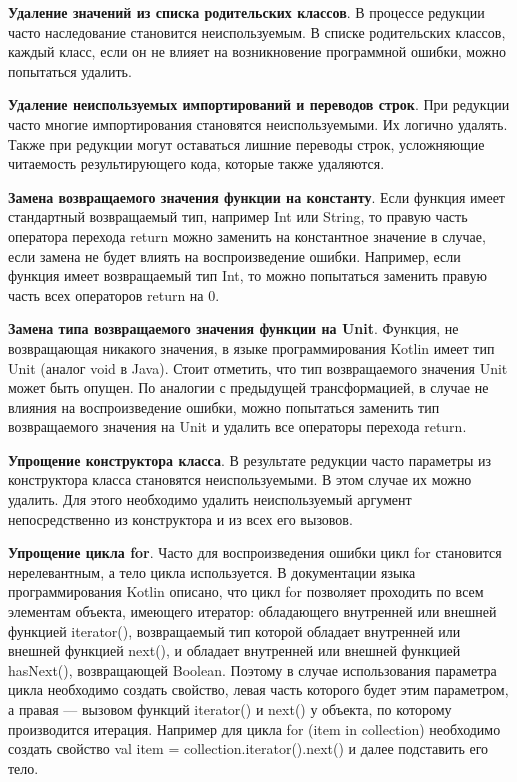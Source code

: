 \textbf{Удаление значений из списка родительских классов}. В процессе редукции часто наследование становится неиспользуемым. В списке родительских классов, каждый класс, если он не влияет на возникновение программной ошибки, можно попытаться удалить.

\textbf{Удаление неиспользуемых импортирований и переводов строк}. При редукции часто многие импортирования становятся неиспользуемыми. Их логично удалять. Также при редукции могут оставаться лишние переводы строк, усложняющие читаемость результирующего кода, которые также удаляются.

\textbf{Замена возвращаемого значения функции на константу}. Если функция имеет стандартный возвращаемый тип, например Int или String, то правую часть оператора перехода return можно заменить на константное значение в случае, если замена не будет влиять на воспроизведение ошибки. Например, если функция имеет возвращаемый тип Int, то можно попытаться заменить правую часть всех операторов return на 0.

\textbf{Замена типа возвращаемого значения функции на Unit}. Функция, не возвращающая никакого значения, в языке программирования Kotlin имеет тип Unit (аналог void в Java). Стоит отметить, что тип возвращаемого значения Unit может быть опущен. По аналогии с предыдущей трансформацией, в случае не влияния на воспроизведение ошибки, можно попытаться заменить тип возвращаемого значения на Unit и удалить все операторы перехода return.

\textbf{Упрощение конструктора класса}. В результате редукции часто параметры из конструктора класса становятся неиспользуемыми. В этом случае их можно удалить. Для этого необходимо удалить неиспользуемый аргумент непосредственно из конструктора и из всех его вызовов.

\textbf{Упрощение цикла for}. Часто для воспроизведения ошибки цикл for становится нерелевантным, а тело цикла используется. В документации языка программирования Kotlin описано, что цикл for позволяет проходить по всем элементам объекта, имеющего итератор:
обладающего внутренней или внешней функцией iterator(), возвращаемый тип которой обладает внутренней или внешней функцией next(), и обладает внутренней или внешней функцией hasNext(), возвращающей Boolean. Поэтому в случае использования параметра цикла необходимо создать свойство, левая часть которого будет этим параметром, а правая --- вызовом функций iterator() и next() у объекта, по которому производится итерация. Например для цикла {\ttfamily for (item in collection)} необходимо создать свойство {\ttfamily val item = collection.iterator().next()} и далее подставить его тело.

